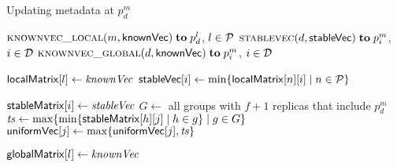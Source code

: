 
\begin{algorithm*}[t]
  \caption{Updating metadata at $p^m_d$}
  \label{alg:unistore-clock}
  \begin{algorithmic}[1]
    \Function{\bcast}{\null} 
      \label{line:function-bcast}
      \State \send $\Call{\knownvclocal}{m, \knownVC} \sendto p^{l}_{d}$, $l \in \P$
        \label{line:bcast-call-knownvclocal}
      \State \send $\Call{\stablevcproc}{d, \stableVC} \sendto p^{m}_{i}$, $i \in \D$
        \label{line:bcast-call-stablevc}
      \State \send $\Call{\knownvcglobal}{d, \knownVC} \sendto p^{m}_{i}$, $i \in \D$
        \label{line:bcast-call-knownvcglobal}
    \EndFunction

    \Statex
      \label{line:function-knownvclocal}
      \State $\localmatrix[l] \gets \knownvc$
        \label{line:knownvclocal-localknownmatrix}
        \State $\stableVC[i] \gets \min \set{\localmatrix[n][i] \mid n \in \P}$
        \label{line:knownvclocal-stablevc-causal}
      \EndFor
      \State {}
        \label{line:knownvclocal-stablevc-strong}
    \EndWhenRcv

    \Statex
      \label{line:function-stablevc}
      \State $\stablematrix[i] \gets \stablevc$
        \label{line:stablevc-stablematrix}
      \State $G\gets$ all groups with $f+1$ replicas that include $p^{m}_{d}$
        \label{line:stablevc-g}
        \State \var $\tsvar \gets \max \set{\min \set{\stablematrix[h][j] \mid h \in g}
          \mid g \in G}$
          \label{line:stablevc-ts}
        \State $\uniformVC[j] \gets \max \set{\uniformVC[j], \tsvar}$
          \label{line:stablevc-uniformvc}
      \EndFor
    \EndWhenRcv

    \Statex
      \label{line:function-knownvcglobal}
      \State $\globalmatrix[l] \gets \knownvc$
        \label{line:knownvcglobal-globalmatrix}
    \EndWhenRcv
  \end{algorithmic}
\end{algorithm*}